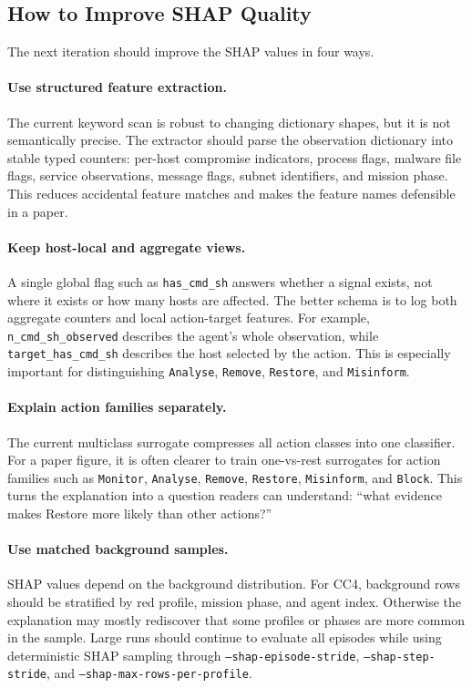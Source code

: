 \subsection{How to Improve SHAP Quality}

The next iteration should improve the SHAP values in four ways.

\paragraph{Use structured feature extraction.}
The current keyword scan is robust to changing dictionary shapes, but it is not
semantically precise. The extractor should parse the observation dictionary into
stable typed counters: per-host compromise indicators, process flags, malware
file flags, service observations, message flags, subnet identifiers, and mission
phase. This reduces accidental feature matches and makes the feature names
defensible in a paper.

\paragraph{Keep host-local and aggregate views.}
A single global flag such as \texttt{has\_cmd\_sh} answers whether a signal
exists, not where it exists or how many hosts are affected. The better schema is
to log both aggregate counters and local action-target features. For example,
\texttt{n\_cmd\_sh\_observed} describes the agent's whole observation, while
\texttt{target\_has\_cmd\_sh} describes the host selected by the action. This is
especially important for distinguishing \texttt{Analyse}, \texttt{Remove},
\texttt{Restore}, and \texttt{Misinform}.

\paragraph{Explain action families separately.}
The current multiclass surrogate compresses all action classes into one
classifier. For a paper figure, it is often clearer to train one-vs-rest
surrogates for action families such as \texttt{Monitor}, \texttt{Analyse},
\texttt{Remove}, \texttt{Restore}, \texttt{Misinform}, and \texttt{Block}. This
turns the explanation into a question readers can understand: ``what evidence
makes Restore more likely than other actions?''

\paragraph{Use matched background samples.}
SHAP values depend on the background distribution. For CC4, background rows
should be stratified by red profile, mission phase, and agent index. Otherwise
the explanation may mostly rediscover that some profiles or phases are more
common in the sample. Large runs should continue to evaluate all episodes while
using deterministic SHAP sampling through \texttt{--shap-episode-stride},
\texttt{--shap-step-stride}, and \texttt{--shap-max-rows-per-profile}.

